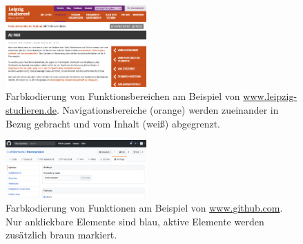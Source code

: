 \begin{figure}[h]
	\centering
	\includegraphics[width=0.48\textwidth]{img/functional_areas.png}
	\caption{Farbkodierung von Funktionsbereichen am Beispiel von \url{www.leipzig-studieren.de}. Navigationsbereiche (orange) werden zueinander in Bezug gebracht und vom Inhalt (weiß) abgegrenzt.}
	\label{fig:functional_areas}
\end{figure}

\begin{figure}[h]
	\centering
	\includegraphics[width=0.48\textwidth]{img/functions.png}
	\caption{Farbkodierung von Funktionen am Beispiel von \url{www.github.com}. Nur anklickbare Elemente sind blau, aktive Elemente werden zusätzlich braun markiert.}
	\label{fig:functions}
\end{figure}

